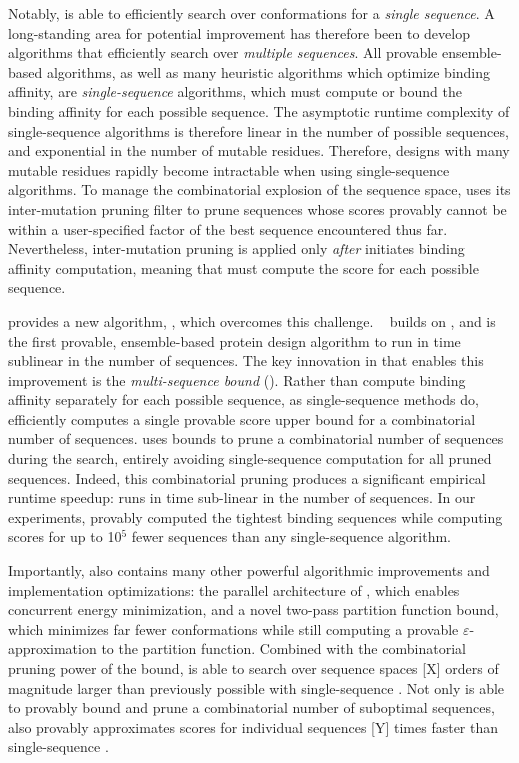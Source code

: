 Notably, \ks is able to efficiently search over conformations for a \textit{single sequence}. A long-standing area for potential improvement has therefore been to develop algorithms that efficiently search over \textit{multiple sequences}. All provable ensemble-based algorithms, as well as many heuristic algorithms which optimize binding affinity, are \emph{single-sequence} algorithms, which must compute or bound the binding affinity for each possible sequence. The asymptotic runtime complexity of single-sequence algorithms is therefore linear in the number of possible sequences, and exponential in the number of mutable residues. Therefore, designs with many mutable residues rapidly become intractable when using single-sequence algorithms. To manage the combinatorial explosion of the sequence space, \ks uses its inter-mutation pruning filter to prune sequences whose \ks scores provably cannot be within a user-specified factor of the best sequence encountered thus far. Nevertheless, inter-mutation pruning is applied only \emph{after} \ks initiates binding affinity computation, meaning that \ks must compute the \ks score for each possible sequence.

 provides a new algorithm, \bbks, which overcomes this challenge. \bbks~\cite{BBK*} builds on \ks, and is the first provable, ensemble-based protein design algorithm to run in time sublinear in the number of sequences. The key innovation in \bbks that enables this improvement is the \emph{multi-sequence bound} (\msbound). Rather than compute binding affinity separately for each possible sequence, as single-sequence methods do, \bbks efficiently computes a single provable \ks score upper bound for a combinatorial number of sequences. \bbks uses \msbound bounds to prune a combinatorial number of sequences during the search, entirely avoiding single-sequence computation for all pruned sequences. Indeed, this combinatorial pruning produces a significant empirical runtime speedup: \bbks runs in time sub-linear in the number of sequences. In our experiments, \bbks provably computed the tightest binding sequences while computing \ks scores for up to 10$^5$ fewer sequences than any single-sequence algorithm.

Importantly, \bbks also contains many other powerful algorithmic improvements and implementation optimizations: the parallel architecture of \bbks, which enables concurrent energy minimization, and a novel two-pass partition function bound, which minimizes far fewer conformations while still computing a provable $\varepsilon$-approximation to the partition function. Combined with the combinatorial pruning power of the \msbound bound, \bbks is able to search over sequence spaces [X] orders of magnitude larger than previously possible with single-sequence \ks. Not only is \bbks able to provably bound and prune a combinatorial number of suboptimal sequences, \bbks also provably approximates \ks scores for individual sequences [Y] times faster than single-sequence \ks.